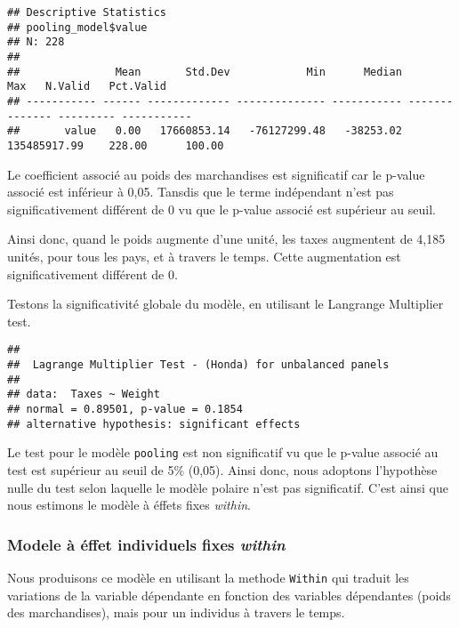 \documentclass[
]{book}
\begin{document}
\begin{verbatim}
## Descriptive Statistics  
## pooling_model$value  
## N: 228  
## 
##               Mean       Std.Dev            Min      Median            Max   N.Valid   Pct.Valid
## ----------- ------ ------------- -------------- ----------- -------------- --------- -----------
##       value   0.00   17660853.14   -76127299.48   -38253.02   135485917.99    228.00      100.00
\end{verbatim}

Le coefficient associé au poids des marchandises est significatif car le p-value associé est inférieur à 0,05. Tansdis que le terme indépendant n'est pas significativement différent de 0 vu que le p-value associé est supérieur au seuil.

Ainsi donc, quand le poids augmente d'une unité, les taxes augmentent de 4,185 unités, pour tous les pays, et à travers le temps. Cette augmentation est significativement différent de 0.

Testons la significativité globale du modèle, en utilisant le Langrange Multiplier test.

\begin{verbatim}
## 
##  Lagrange Multiplier Test - (Honda) for unbalanced panels
## 
## data:  Taxes ~ Weight
## normal = 0.89501, p-value = 0.1854
## alternative hypothesis: significant effects
\end{verbatim}

Le test pour le modèle \texttt{pooling} est non significatif vu que le p-value associé au test est supérieur au seuil de 5\% (0,05). Ainsi donc, nous adoptons l'hypothèse nulle du test selon laquelle le modèle polaire n'est pas significatif. C'est ainsi que nous estimons le modèle à éffets fixes \emph{within}.

\hypertarget{modele-uxe0-uxe9ffet-individuels-fixes-within}{%
\subsubsection{\texorpdfstring{Modele à éffet individuels fixes \emph{within}}{Modele à éffet individuels fixes within}}\label{modele-uxe0-uxe9ffet-individuels-fixes-within}}

Nous produisons ce modèle en utilisant la methode \texttt{Within} qui traduit les variations de la variable dépendante en fonction des variables dépendantes (poids des marchandises), mais pour un individus à travers le temps.
\end{document}
